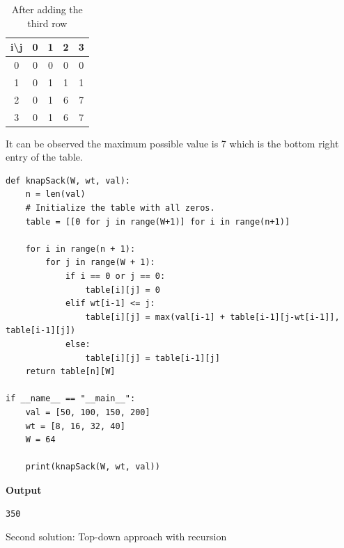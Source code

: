 \documentclass[a4paper,11pt]{book}
\begin{document}
\begin{table}[ht]
\centering
\begin{tabular}{|c|c|c|c|c|}
\hline
i\textbackslash{}j & 0 & 1 & 2 & 3 \\ \hline
0                  & 0 & 0 & 0 & 0 \\ \hline
1                  & 0 & 1 & 1 & 1 \\ \hline
2                  & 0 & 1 & 6 & 7 \\ \hline
3                  & 0 & 1 & 6 & 7 \\ \hline
\end{tabular}
\caption{After adding the third row}
\end{table}

\noindent It can be observed the maximum possible value is 7 which is the bottom right entry of the table.

\begin{lstlisting}
def knapSack(W, wt, val): 
    n = len(val)
    # Initialize the table with all zeros.
    table = [[0 for j in range(W+1)] for i in range(n+1)] 
 
    for i in range(n + 1): 
        for j in range(W + 1): 
            if i == 0 or j == 0: 
                table[i][j] = 0
            elif wt[i-1] <= j: 
                table[i][j] = max(val[i-1] + table[i-1][j-wt[i-1]], table[i-1][j]) 
            else: 
                table[i][j] = table[i-1][j] 
    return table[n][W] 

if __name__ == "__main__":
    val = [50, 100, 150, 200]
    wt = [8, 16, 32, 40]
    W = 64
    
    print(knapSack(W, wt, val))
\end{lstlisting}
\textbf{Output}
\begin{lstlisting}
350
\end{lstlisting}

\noindent Second solution: Top-down approach with recursion
\end{document}
